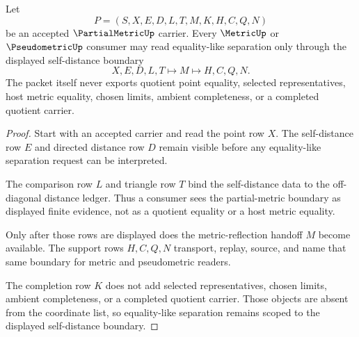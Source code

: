 \begin{theorem}
\label{thm:partial-metric-self-distance-boundary}
Let
$$
P=(S,X,E,D,L,T,M,K,H,C,Q,N)
$$
be an accepted $\PartialMetricUp$ carrier. Every $\MetricUp$ or $\PseudometricUp$ consumer may read equality-like separation only through the displayed self-distance boundary
$$
X,E,D,L,T \longmapsto M \longmapsto H,C,Q,N .
$$
The packet itself never exports quotient point equality, selected representatives, host metric equality, chosen limits, ambient completeness, or a completed quotient carrier.
\end{theorem}
\begin{proof}
Start with an accepted carrier and read the point row $X$. The self-distance row $E$ and directed distance row $D$ remain visible before any equality-like separation request can be interpreted.

The comparison row $L$ and triangle row $T$ bind the self-distance data to the off-diagonal distance ledger. Thus a consumer sees the partial-metric boundary as displayed finite evidence, not as a quotient equality or a host metric equality.

Only after those rows are displayed does the metric-reflection handoff $M$ become available. The support rows $H,C,Q,N$ transport, replay, source, and name that same boundary for metric and pseudometric readers.

The completion row $K$ does not add selected representatives, chosen limits, ambient completeness, or a completed quotient carrier. Those objects are absent from the coordinate list, so equality-like separation remains scoped to the displayed self-distance boundary.
\end{proof}


\begin{closurestatus}{\PartialMetricUp}
  \theoryclosure{\seedClosure}
  \formalstatus{\unformalizedV}
\end{closurestatus}
